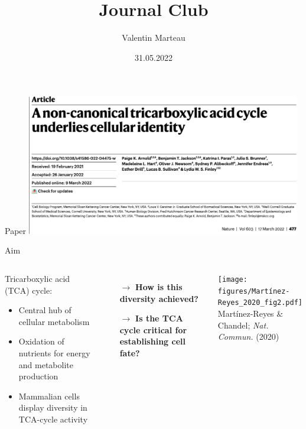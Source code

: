 \documentclass[10pt, aspectratio=169]{beamer}
\title{Journal Club}
\author{Valentin Marteau}
\date{31.05.2022}
\begin{document}
\frame{\titlepage}

\begin{frame}{Paper}
\centering
\includegraphics[width=0.9\textwidth]{figures/Arnold_2022_title.pdf}
\end{frame}

\begin{frame}{Aim}
\begin{columns}

\begin{block}{\centering Tricarboxylic acid (TCA) cycle:}
\vspace{0.2cm}
    \begin{itemize}
        \item Central hub of cellular metabolism \\[0.1cm]
        \item Oxidation of nutrients for energy and metabolite production \\[0.1cm]
        \item Mammalian cells display diversity in TCA-cycle activity \\[0.1cm]
    \end{itemize}
\vspace{0.2cm}
\end{block}

\vspace{0.6cm}

\begin{itemize}
    \item[$\rightarrow$] \textbf{How is this diversity achieved?} \\[0.3cm]
    \item[$\rightarrow$] \textbf{Is the TCA cycle critical for establishing cell fate?}
\end{itemize}

\centering
\texttt{[image: figures/Martínez-Reyes\_2020\_fig2.pdf]}\\[0.1cm]
\tiny{Martínez-Reyes \& Chandel; \textit{Nat. Commun.} (2020)}
\end{columns}
\end{frame}
\end{document}
